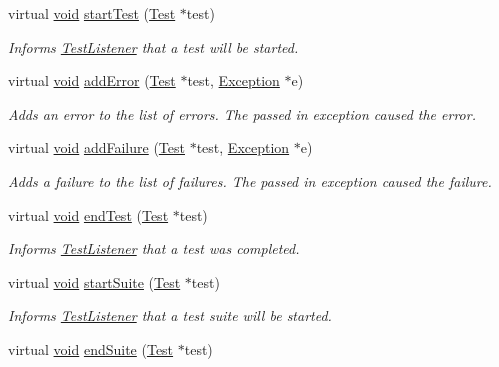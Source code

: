 \begin{DoxyCompactItemize}
virtual \hyperlink{wglew_8h_aeea6e3dfae3acf232096f57d2d57f084}{void} \hyperlink{class_test_result_a4acd959411284f57a26eefe4c79c30d3}{start\-Test} (\hyperlink{class_test}{Test} $\ast$test)
\begin{DoxyCompactList}\small\item\em Informs \hyperlink{class_test_listener}{Test\-Listener} that a test will be started. \end{DoxyCompactList}\item 
virtual \hyperlink{wglew_8h_aeea6e3dfae3acf232096f57d2d57f084}{void} \hyperlink{class_test_result_a25b7f26ec9a52ea4e05b38a490d381c5}{add\-Error} (\hyperlink{class_test}{Test} $\ast$test, \hyperlink{class_exception}{Exception} $\ast$e)
\begin{DoxyCompactList}\small\item\em Adds an error to the list of errors. The passed in exception caused the error. \end{DoxyCompactList}\item 
virtual \hyperlink{wglew_8h_aeea6e3dfae3acf232096f57d2d57f084}{void} \hyperlink{class_test_result_a648e7986cd583f7687dfaa88b5b2c080}{add\-Failure} (\hyperlink{class_test}{Test} $\ast$test, \hyperlink{class_exception}{Exception} $\ast$e)
\begin{DoxyCompactList}\small\item\em Adds a failure to the list of failures. The passed in exception caused the failure. \end{DoxyCompactList}\item 
virtual \hyperlink{wglew_8h_aeea6e3dfae3acf232096f57d2d57f084}{void} \hyperlink{class_test_result_abad5c059d9f01f251057c6065a5c35b3}{end\-Test} (\hyperlink{class_test}{Test} $\ast$test)
\begin{DoxyCompactList}\small\item\em Informs \hyperlink{class_test_listener}{Test\-Listener} that a test was completed. \end{DoxyCompactList}\item 
virtual \hyperlink{wglew_8h_aeea6e3dfae3acf232096f57d2d57f084}{void} \hyperlink{class_test_result_a9e21095aa704141c285819b99785326f}{start\-Suite} (\hyperlink{class_test}{Test} $\ast$test)
\begin{DoxyCompactList}\small\item\em Informs \hyperlink{class_test_listener}{Test\-Listener} that a test suite will be started. \end{DoxyCompactList}\item 
virtual \hyperlink{wglew_8h_aeea6e3dfae3acf232096f57d2d57f084}{void} \hyperlink{class_test_result_acacd853a4392a0473b3407051d79d471}{end\-Suite} (\hyperlink{class_test}{Test} $\ast$test)

\end{DoxyCompactItemize}
